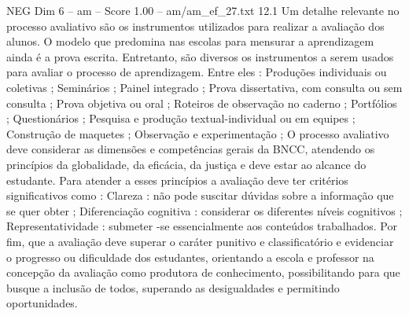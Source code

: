 \begin{textsample}{NEG Dim 6 – am – Score 1.00 – am/am\_ef\_27.txt}  \label{ex:f6_neg_027}
12.1 Um detalhe relevante no processo avaliativo são os instrumentos utilizados para realizar a avaliação dos alunos.
O modelo que predomina nas escolas para mensurar a aprendizagem ainda é a prova escrita.
Entretanto, são diversos os instrumentos a serem usados para avaliar o processo de aprendizagem.
Entre eles : Produções individuais ou coletivas ; Seminários ; Painel integrado ; Prova dissertativa, com consulta ou sem consulta ; Prova objetiva ou oral ; Roteiros de observação no caderno ; Portfólios ; Questionários ; Pesquisa e produção textual-individual ou em equipes ; Construção de maquetes ; Observação e experimentação ; O processo avaliativo deve considerar as dimensões e competências gerais da BNCC, atendendo os princípios da globalidade, da eficácia, da justiça e deve estar ao alcance do estudante.
Para atender a esses princípios a avaliação deve ter critérios significativos como : Clareza : não pode suscitar dúvidas sobre a informação que se quer obter ; Diferenciação cognitiva : considerar os diferentes níveis cognitivos ; Representatividade : submeter -se essencialmente aos conteúdos trabalhados.
Por fim, que a avaliação deve superar o caráter punitivo e classificatório e evidenciar o progresso ou dificuldade dos estudantes, orientando a escola e professor na concepção da avaliação como produtora de conhecimento, possibilitando para que busque a inclusão de todos, superando as desigualdades e permitindo oportunidades.

\end{textsample}
